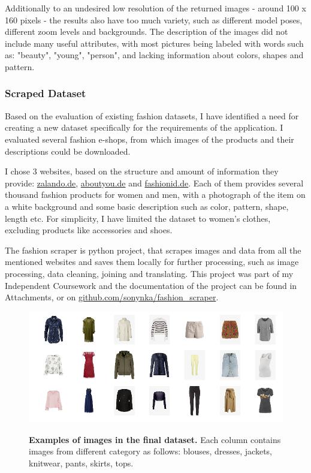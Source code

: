 \documentclass{article}
\begin{document}
Additionally to an undesired low resolution of the returned images - around 100 x 160 pixels - the results also have too much variety, such as different model poses, different zoom levels and backgrounds. The description of the images did not include many useful attributes, with most pictures being labeled with words such as: "beauty", "young", "person", and lacking information about colors, shapes and pattern.

\subsubsection{Scraped Dataset}
Based on the evaluation of existing fashion datasets, I have identified a need for creating a new dataset specifically for the requirements of the application. I evaluated several fashion e-shops, from which images of the products and their descriptions could be downloaded. 

I chose 3 websites, based on the structure and amount of information they provide: \href{https://www.zalando.de/damen-home/}{zalando.de}, \href{https://www.aboutyou.de/}{aboutyou.de} and \href{https://www.fashionid.de/damen/}{fashionid.de}. Each of them provides several thousand fashion products for women and men, with a photograph of the item on a white background and some basic description such as color, pattern, shape, length etc. For simplicity, I have limited the dataset to women's clothes, excluding products like accessories and shoes.

The fashion scraper is python project, that scrapes images and data from all the mentioned websites and saves them locally for further processing, such as image processing, data cleaning, joining and translating. This project was part of my Independent Coursework and the documentation of the project can be found in Attachments, or on \href{https://github.com/sonynka/fashion_scraper}{github.com/sonynka/fashion\_scraper}.

\begin{figure}[h]
\centering
{\includegraphics[width=\linewidth]{dataset_examples/img_grid2}}
\caption{\label{fig:dataset} \textbf{Examples of images in the final dataset.} Each column contains images from different category as follows: blouses, dresses, jackets, knitwear, pants, skirts, tops.}
\end{figure}
\end{document}
